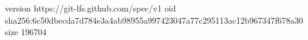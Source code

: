 version https://git-lfs.github.com/spec/v1
oid sha256:6c50dbecda7d784e3a4ab98955a997423047a77c295113ac12b967347f678a30
size 196704
